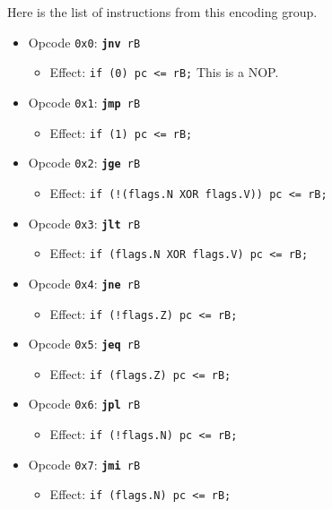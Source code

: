\documentclass{article}
\begin{document}
	Here is the list of instructions from this encoding group.

	\singlespacing
	\begin{itemize}
		\item Opcode \texttt{0x0}:
			\texttt{\textbf{jnv} rB}
		\begin{itemize}
			\item Effect:
				\texttt{if (0) pc <= rB;} This is a NOP.
		\end{itemize}
		\item Opcode \texttt{0x1}:
			\texttt{\textbf{jmp} rB}
		\begin{itemize}
			\item Effect:
				\texttt{if (1) pc <= rB;}
		\end{itemize}
		\item Opcode \texttt{0x2}:
			\texttt{\textbf{jge} rB}
		\begin{itemize}
			\item Effect:
				\texttt{if (!(flags.N XOR flags.V)) pc <= rB;}
		\end{itemize}
		\item Opcode \texttt{0x3}:
			\texttt{\textbf{jlt} rB}
		\begin{itemize}
			\item Effect:
				\texttt{if (flags.N XOR flags.V) pc <= rB;}
		\end{itemize}
		\item Opcode \texttt{0x4}:
			\texttt{\textbf{jne} rB}
		\begin{itemize}
			\item Effect:
				\texttt{if (!flags.Z) pc <= rB;}
		\end{itemize}
		\item Opcode \texttt{0x5}:
			\texttt{\textbf{jeq} rB}
		\begin{itemize}
			\item Effect:
				\texttt{if (flags.Z) pc <= rB;}
		\end{itemize}
		\item Opcode \texttt{0x6}:
			\texttt{\textbf{jpl} rB}
		\begin{itemize}
			\item Effect:
				\texttt{if (!flags.N) pc <= rB;}
		\end{itemize}
		\item Opcode \texttt{0x7}:
			\texttt{\textbf{jmi} rB}
		\begin{itemize}
			\item Effect:
				\texttt{if (flags.N) pc <= rB;}
		\end{itemize}

\end{itemize}
\end{document}
